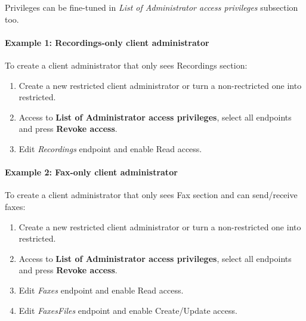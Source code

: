\documentclass[letterpaper,10pt,spanish]{sphinxmanual}
\begin{document}
Privileges can be fine-tuned in \emph{List of Administrator access privileges} subsection too.
\paragraph{Example 1: Recordings-only client administrator}

To create a client administrator that only sees Recordings section:
\begin{enumerate}
\item {} 
Create a new restricted client administrator or turn a non-rectricted one into restricted.

\item {} 
Access to \textbf{List of Administrator access privileges}, select all endpoints and press \textbf{Revoke access}.

\item {} 
Edit \emph{Recordings} endpoint and enable Read access.

\end{enumerate}
\paragraph{Example 2: Fax-only client administrator}

To create a client administrator that only sees Fax section and can send/receive faxes:
\begin{enumerate}
\item {} 
Create a new restricted client administrator or turn a non-restricted one into restricted.

\item {} 
Access to \textbf{List of Administrator access privileges}, select all endpoints and press \textbf{Revoke access}.

\item {} 
Edit \emph{Faxes} endpoint and enable Read access.

\item {} 
Edit \emph{FaxesFiles} endpoint and enable Create/Update access.

\end{enumerate}



\renewcommand{\indexname}{Índice}
\printindex
\end{document}
